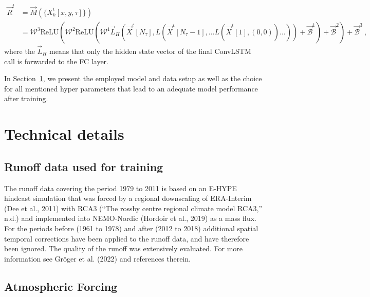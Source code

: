 \documentclass[
]{agujournal2019}
\begin{document}
\[
\begin{aligned}
\vec{R}^t & = \vec{M}(\{X^t_k[x,y,\tau]\}) \\
& = \pmb{\mathcal{W}}^{3}\mathrm{ReLU}\left(\pmb{\mathcal{W}}^{2}\mathrm{ReLU}\left(\pmb{\mathcal{W}}^{1} \vec{L}_H \left( \vec{X}^t[N_\tau], L \left( \vec{X}^t[N_\tau-1], \ldots L \left( \vec{X}^t[1], (0, 0) \right) \ldots \right) \right) + \vec{\mathcal{B}}^1\right) + \vec{\mathcal{B}}^2 \right) + \vec{\mathcal{B}}^3 \ ,
\end{aligned}
\] where the \(\vec{L}_H\) means that only the hidden state vector of
the final ConvLSTM call is forwarded to the FC layer.

In Section~\ref{sec-technical_details}, we present the employed model
and data setup as well as the choice for all mentioned hyper parameters
that lead to an adequate model performance after training.

\hypertarget{sec-technical_details}{%
\section{Technical details}\label{sec-technical_details}}

\hypertarget{runoff-data-used-for-training}{%
\subsection{Runoff data used for
training}\label{runoff-data-used-for-training}}

The runoff data covering the period 1979 to 2011 is based on an E-HYPE
hindcast simulation that was forced by a regional downscaling of
ERA-Interim (Dee et al., 2011) with RCA3 ({``The rossby centre regional
climate model RCA3,''} n.d.) and implemented into NEMO-Nordic (Hordoir
et al., 2019) as a mass flux. For the periods before (1961 to 1978) and
after (2012 to 2018) additional spatial temporal corrections have been
applied to the runoff data, and have therefore been ignored. The quality
of the runoff was extensively evaluated. For more information see Gröger
et al. (2022) and references therein.

\hypertarget{atmospheric-forcing}{%
\subsection{Atmospheric Forcing}\label{atmospheric-forcing}}
\end{document}
